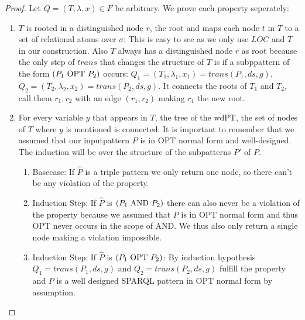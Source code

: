 \begin{proof}
	Let $Q=(T,\lambda,x) \in F$ be arbitrary. We prove each property seperately:
	\begin{enumerate}
		\item $T$ is rooted in a distinguished node $r$, the root and maps
			each node $t$ in  $T$ to a set of relational atoms over $\sigma$:
			This is easy to see as we only use $LOC$ and $T$ in our
			construction. Also $T$ always has a distinguished node $r$ as root
			because the only step of $trans$ that changes the structure of $T$
			is if a subppattern of the form $(P_1 \mbox{ OPT } P_2)$ occurs: 
			$Q_1 = (T_1,\lambda_1,x_1)  = trans(P_1,ds,g)$,
			$Q_2 = (T_2,\lambda_2,x_2)  = trans(P_2,ds,g)$. 
			It connects the roots of $T_1$ and $T_2$, call them $r_1,r_2$ with
			an edge $(r_1,r_2)$ making $r_1$ the new root.  

		\item For every variable $y$ that appears
			in $T$, the tree of the wdPT, the set of nodes of $T$ where $y$ is mentioned is connected.
			It is important to remember that we assumed that our inputpattern $P$ is 
			in OPT normal form and well-designed.
			The induction will be over the structure of the subpatterns $P'$ of $P$.
			\begin{enumerate}
			
				\item Basecase: If $\hat{P}$ is a triple pattern we only return one node, so there can't be any
					violation of the property.

				\item Induction Step: If $\hat{P}$ is $(P_1 \mbox{ AND }  P_2)$ there can 
					also never be a violation of the
					property because we assumed that $P$ is in OPT normal form and thus OPT never
					occurs in the scope of AND. We thus also only return a single node making a
					violation impossible.

				\item Induction Step: If $\hat{P}$ is $(P_1 \mbox{ OPT }  P_2)$:
					By induction hypothesis $Q_1 = trans(P_1,ds,g)$ and $Q_2 =
					trans(P_2,ds,g)$ fulfill the property and $P$ 
					is a well designed SPARQL pattern in OPT normal form by assumption. 


\end{enumerate}
\end{enumerate}
\end{proof}
